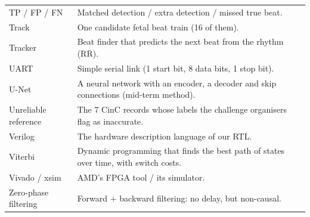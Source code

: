 \documentclass[11pt]{article}
\begin{document}
{\begin{longtable}{@{}p{3.4cm} p{12.0cm}@{}}
TP / FP / FN & Matched detection / extra detection / missed true beat. \\
Track & One candidate fetal beat train (16 of them). \\
Tracker & Beat finder that predicts the next beat from the rhythm (RR). \\
UART & Simple serial link (1 start bit, 8 data bits, 1 stop bit). \\
U-Net & A neural network with an encoder, a decoder and skip connections (mid-term method). \\
Unreliable reference & The 7 CinC records whose labels the challenge organisers flag as inaccurate. \\
Verilog & The hardware description language of our RTL. \\
Viterbi & Dynamic programming that finds the best path of states over time, with switch costs. \\
Vivado / xsim & AMD's FPGA tool / its simulator. \\
Zero-phase filtering & Forward + backward filtering: no delay, but non-causal. \\
\bottomrule
\end{longtable}
}
\end{document}
